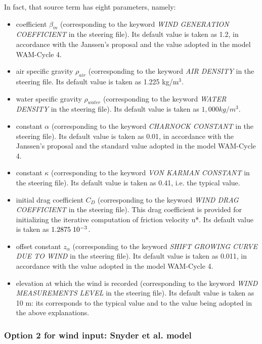 In fact, that source term has eight parameters, namely:

\begin{itemize}
\item  coefficient $\beta_m$ (corresponding to the keyword \textit{WIND GENERATION COEFFICIENT }in the steering file). Its default value is taken as 1.2, in accordance with the Janssen's proposal \cite{Janssen1991} and the value adopted in the model WAM-Cycle 4.
\item  air specific gravity $\rho_{air}$ (corresponding to the keyword \textit{AIR DENSITY} in the steering file. Its default value is taken as 1.225 kg/m${}^{3}$.
\item  water specific gravity ${\rho}_{water}$ (corresponding to the keyword \textit{WATER DENSITY} in the steering file). Its default value is taken as $1,000 kg/m^{3}$.
\item  constant $\alpha$ (corresponding to the keyword \textit{CHARNOCK CONSTANT} in the steering file). Its default value is taken as 0.01, in accordance with the Janssen's proposal and the standard value adopted in the model WAM-Cycle 4.
\item  constant $\kappa$ (corresponding to the keyword \textit{VON KARMAN CONSTANT} in the steering file). Its default value is taken as 0.41, i.e. the typical value.
\item  initial drag coefficient $C_D$ (corresponding to the keyword \textit{WIND DRAG COEFFICIENT} in the steering file). This drag coefficient is provided for initializing the iterative computation of friction velocity u*. Its default value is taken as $1.2875\hspace{.1cm} 10^{-3}$.
\item  offset constant $z_\alpha$ (corresponding to the keyword \textit{SHIFT GROWING CURVE DUE TO WIND} in the steering file). Its default value is taken as 0.011, in accordance with the value adopted in the model WAM-Cycle 4.
\item  elevation at which the wind is recorded (corresponding to the keyword \textit{WIND MEASUREMENTS LEVEL} in the steering file). Its default value is taken as 10 m: its corresponds to the typical value and to the value being adopted in the above explanations.
\end{itemize}


\subsubsection{Option 2 for wind input: Snyder et al. model}
\label{parag4.3.2.2}


